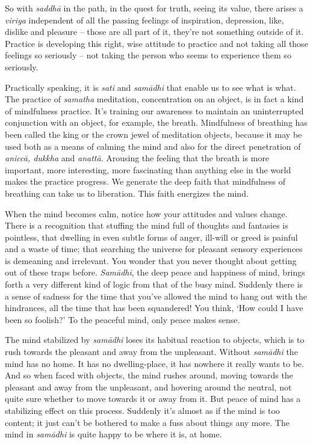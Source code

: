 So with \emph{saddhā} in the path, in the quest for truth, seeing its
value, there arises a \emph{viriya} independent of all the passing
feelings of inspiration, depression, like, dislike and pleasure --
those are all part of it, they're not something outside of it. Practice
is developing this right, wise attitude to practice and not taking all
those feelings so seriously -- not taking the person who seems to
experience them so seriously.

Practically speaking, it is \emph{sati} and \emph{samādhi} that enable
us to see what is what. The practice of \emph{samatha} meditation,
concentration on an object, is in fact a kind of mindfulness practice.
It's training our awareness to maintain an uninterrupted conjunction
with an object, for example, the breath. Mindfulness of breathing has
been called the king or the crown jewel of meditation objects, because
it may be used both as a means of calming the mind and also for the
direct penetration of \emph{aniccā, dukkha} and \emph{anattā}. Arousing
the feeling that the breath is more important, more interesting, more
fascinating than anything else in the world makes the practice progress.
We generate the deep faith that mindfulness of breathing can take us to
liberation. This faith energizes the mind.

When the mind becomes calm, notice how your attitudes and values change.
There is a recognition that stuffing the mind full of thoughts and
fantasies is pointless, that dwelling in even subtle forms of anger,
ill-will or greed is painful and a waste of time; that searching the
universe for pleasant sensory experiences is demeaning and irrelevant.
You wonder that you never thought about getting out of these traps
before. \emph{Samādhi}, the deep peace and happiness of mind, brings
forth a very different kind of logic from that of the busy mind.
Suddenly there is a sense of sadness for the time that you've allowed
the mind to hang out with the hindrances, all the time that has been
squandered! You think, `How could I have been so foolish?' To the
peaceful mind, only peace makes sense.

The mind stabilized by \emph{samādhi} loses its habitual reaction to
objects, which is to rush towards the pleasant and away from the
unpleasant. Without \emph{samādhi} the mind has no home. It has no
dwelling-place, it has nowhere it really wants to be. And so when faced
with objects, the mind rushes around, moving towards the pleasant and
away from the unpleasant, and hovering around the neutral, not quite
sure whether to move towards it or away from it. But peace of mind has a
stabilizing effect on this process. Suddenly it's almost as if the mind
is too content; it just can't be bothered to make a fuss about things
any more. The mind in \emph{samādhi} is quite happy to be where it is,
at home.

